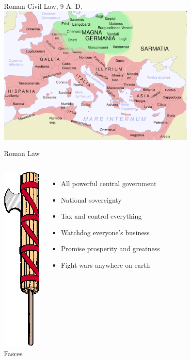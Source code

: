 \begin{frame}{Roman Civil Law, 9 A. D.}
    \centering
    \includegraphics[width=0.75\textwidth]{img/europe-map.png} \\
\end{frame}

\begin{frame}{Roman Law}
    \begin{columns}[onlytextwidth]
            \centering
            \includegraphics[height=0.55\textheight]{img/fasces.png} \\
            Fasces \\

            \begin{itemize}
                \item All powerful central government
                \item National sovereignty
                \item Tax and control everything
                \item Watchdog everyone's business
                \item Promise prosperity and greatness
                \item Fight wars anywhere on earth
            \end{itemize}
    \end{columns}
\end{frame}

